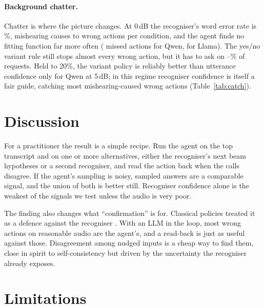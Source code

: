 \documentclass[11pt]{article}
\begin{document}
\paragraph{Background chatter.} Chatter is where the picture changes. At 0\,dB the recogniser's word error rate is \WerChatterZero\%, mishearing causes \HearCausedChatMin{} to \HearCausedChatMax{} wrong actions per condition, and the agent finds no fitting function far more often (\QwenMissedChatter{} missed actions for Qwen, \LlamaMissedChatter{} for Llama). The yes/no variant rule still stops almost every wrong action, but it has to ask on \ChatterAskedMin--\ChatterAskedMax\% of requests. Held to 20\%, the variant policy is reliably better than utterance confidence only for Qwen at 5\,dB; in this regime recogniser confidence is itself a fair guide, catching most mishearing-caused wrong actions (Table~\ref{tab:catch}).

\section{Discussion}

For a practitioner the result is a simple recipe. Run the agent on the top transcript and on one or more alternatives, either the recogniser's next beam hypotheses or a second recogniser, and read the action back when the calls disagree. If the agent's sampling is noisy, sampled answers are a comparable signal, and the union of both is better still. Recogniser confidence alone is the weakest of the signals we test unless the audio is very poor.

The finding also changes what ``confirmation'' is for. Classical policies treated it as a defence against the recogniser \citep{sturm1999arise,bohus2005rejection}. With an LLM in the loop, most wrong actions on reasonable audio are the agent's, and a read-back is just as useful against those. Disagreement among nudged inputs is a cheap way to find them, close in spirit to self-consistency \citep{wang2023selfconsistency} but driven by the uncertainty the recogniser already exposes.

\section{Limitations}
\end{document}
